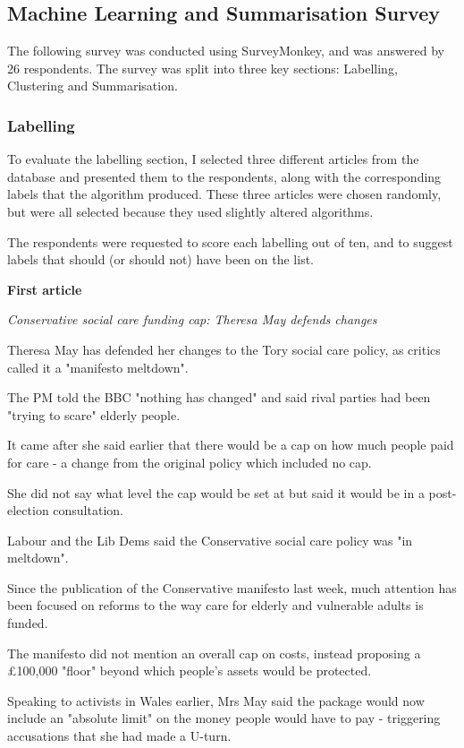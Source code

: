 \documentclass[12pt]{article}
\begin{document}
\subsection{Machine Learning and Summarisation Survey}

The following survey was conducted using SurveyMonkey, and was answered by 26 respondents. The survey was split into three key sections: Labelling, Clustering and Summarisation.

\subsubsection{Labelling}

To evaluate the labelling section, I selected three different articles from the database and presented them to the respondents, along with the corresponding labels that the algorithm produced. These three articles were chosen randomly, but were all selected because they used slightly altered algorithms.

The respondents were requested to score each labelling out of ten, and to suggest labels that should (or should not) have been on the list.

\textbf{First article}

\emph{Conservative social care funding cap: Theresa May defends changes}

Theresa May has defended her changes to the Tory social care policy, as critics called it a "manifesto meltdown".

The PM told the BBC "nothing has changed" and said rival parties had been "trying to scare" elderly people.

It came after she said earlier that there would be a cap on how much people paid for care - a change from the original policy which included no cap.

She did not say what level the cap would be set at but said it would be in a post-election consultation.

Labour and the Lib Dems said the Conservative social care policy was "in meltdown".

Since the publication of the Conservative manifesto last week, much attention has been focused on reforms to the way care for elderly and vulnerable adults is funded.

The manifesto did not mention an overall cap on costs, instead proposing a \pounds100,000 "floor" beyond which people's assets would be protected.

Speaking to activists in Wales earlier, Mrs May said the package would now include an "absolute limit" on the money people would have to pay - triggering accusations that she had made a U-turn.
\end{document}
